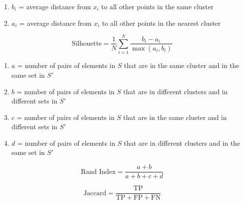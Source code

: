 \documentclass[10pt]{article}
\begin{document}
\begin{multicols}{2}
\begin{enumerate}
    \item $b_i$ = average distance from $x_i$ to all other points in the same cluster
    \vspace*{-6pt}
    \item $a_i$ = average distance from $x_i$ to all other points in the nearest cluster
\end{enumerate}
\begin{equation*}
    \text{Silhouette} = \frac{1}{N} \sum_{i=1}^{N} \frac{b_i - a_i}{\max(a_i, b_i)}
\end{equation*}

\begin{enumerate}
    \item $a$ = number of pairs of elements in $S$ that are in the same cluster and in the same set in $S'$
    \vspace*{-6pt}
    \item $b$ = number of pairs of elements in $S$ that are in different clusters and in different sets in $S'$
    \vspace*{-6pt}
    \item $c$ = number of pairs of elements in $S$ that are in the same cluster and in different sets in $S'$
    \vspace*{-6pt}
    \item $d$ = number of pairs of elements in $S$ that are in different clusters and in the same set in $S'$
\end{enumerate}

\begin{equation*}
    \text{Rand Index} = \frac{a + b}{a + b + c + d}
\end{equation*}

\begin{equation*}
    \text{Jaccard} = \frac{\text{TP}}{\text{TP} + \text{FP} + \text{FN}}
\end{equation*}


\end{multicols}
\end{document}
